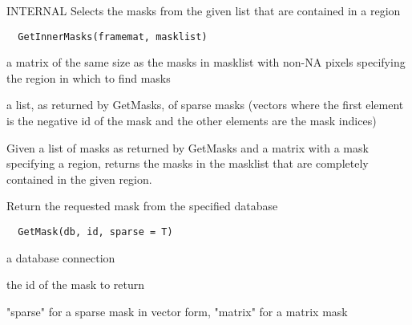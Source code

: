\documentclass[a4paper]{book}
\begin{document}
%
\begin{Description}\relax
INTERNAL Selects the masks from the given list that are
contained in a region
\end{Description}
%
\begin{Usage}
\begin{verbatim}
  GetInnerMasks(framemat, masklist)
\end{verbatim}
\end{Usage}
%
\begin{Arguments}
\begin{ldescription}
\item[\code{framemat}] a matrix of the same size as the masks in
masklist with non-NA pixels specifying the region in
which to find masks

\item[\code{masklist}] a list, as returned by GetMasks, of
sparse masks (vectors where the first element is the
negative id of the mask and the other elements are the
mask indices)
\end{ldescription}
\end{Arguments}
%
\begin{Details}\relax
Given a list of masks as returned by GetMasks and a
matrix with a mask specifying a region, returns the masks
in the masklist that are completely contained in the
given region.
\end{Details}
%
\begin{Description}\relax
Return the requested mask from the specified database
\end{Description}
%
\begin{Usage}
\begin{verbatim}
  GetMask(db, id, sparse = T)
\end{verbatim}
\end{Usage}
%
\begin{Arguments}
\begin{ldescription}
\item[\code{db}] a database connection

\item[\code{id}] the id of the mask to return

\item[\code{format}] "sparse" for a sparse mask in vector form,
"matrix" for a matrix mask
\end{ldescription}
\end{Arguments}
\end{document}
